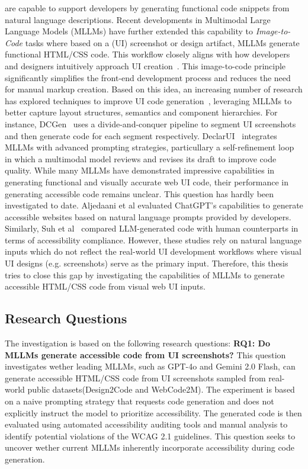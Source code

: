 are capable to support developers by generating functional code 
snippets from natural language descriptions. Recent developments in 
Multimodal Large Language Models (MLLMs) have further extended this capability to
\textit{Image-to-Code} tasks where based on a (UI) screenshot or design 
artifact,
MLLMs generate functional HTML/CSS code. This workflow closely aligns 
with how developers and designers intuitively approach UI
creation~\cite{chen2018ui,feng2022auto}. This image-to-code 
principle significantly simplifies the front-end development process and 
reduces the need for manual markup creation. Based on this idea,
an increasing number of research has explored techniques to improve 
UI code generation~\cite{cali2025prototype,mowar2025codea11y,wu2025ui2code}, 
leveraging MLLMs to better capture layout structures, semantics 
and component hierarchies. For instance, DCGen~\cite{wan2024dcgen}
uses a divide-and-conquer pipeline to segment UI screenshots and then 
generate code for each segment respectively. 
DeclarUI~\cite{zhou2024declarui} integrates MLLMs with advanced 
prompting strategies, particullary a self-refinement loop in which 
a multimodal model reviews and revises its draft to improve code
quality.\newline
While many MLLMs have demonstrated impressive capabilities 
in generating functional and visually accurate web UI code, 
their performance in generating accessible code remains unclear.
This question has hardly been investigated to date. 
Aljedaani et al\cite{aljedaani2024chatgpt} evaluated ChatGPT's
capabilities to generate accessible websites based on natural 
language prompts provided by developers. Similarly, Suh et 
al~\cite{suh2025accessiblecode} compared LLM-generated code
with human counterparts in terms of accessibility compliance.
However, these studies rely on natural language inputs which do
not reflect the real-world UI development workflows where visual 
UI designs (e.g. screenshots) serve as the primary input. Therefore,
this thesis tries to close this gap by investigating the capabilities 
of MLLMs to generate accessible HTML/CSS code from visual web 
UI inputs. 

\subsection{Research Questions}
The investigation is based on the following research 
questions:\newline
\textbf{RQ1: Do MLLMs generate accessible code from UI screenshots?}
This question investigates wether leading MLLMs, such as GPT-4o and 
Gemini 2.0 Flash, can generate accessible HTML/CSS code from UI 
screenshots sampled from real-world public datasets(Design2Code and 
WebCode2M). The experiment is based on a naive prompting strategy 
that requests code generation and does not explicitly instruct 
the model to prioritize accessibility. The generated code is 
then evaluated using automated accessibility auditing tools and 
manual analysis to identify potential violations of the WCAG 2.1
guidelines. This question seeks to uncover wether current MLLMs
inherently incorporate accessibility during 
code generation.\newline

